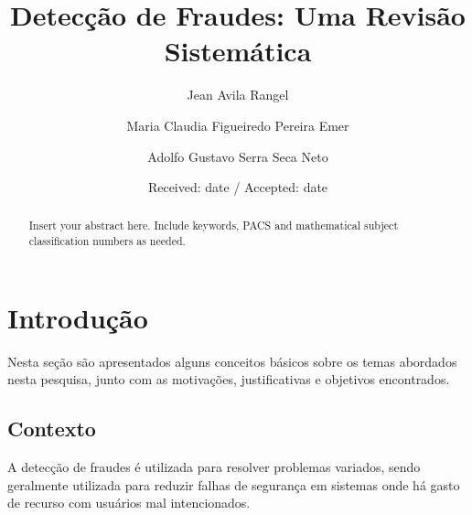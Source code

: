 \documentclass[smallextended]{svjour3}       %
\begin{document}
	
\title{Detecção de Fraudes: Uma Revisão Sistemática
}
\subtitle{}


\author{Jean Avila Rangel         \and
	Maria Claudia Figueiredo Pereira Emer \and
	Adolfo Gustavo Serra Seca Neto
}

	\date{Received: date / Accepted: date}
	\maketitle
	
	\begin{abstract}
		Insert your abstract here. Include keywords, PACS and mathematical
		subject classification numbers as needed.
	\end{abstract}
	
\section{Introdução}

Nesta seção são apresentados alguns conceitos básicos sobre os temas abordados nesta pesquisa, junto com as motivações, justificativas e objetivos encontrados.

\subsection{Contexto}

A detecção de fraudes é utilizada para resolver problemas variados, sendo geralmente utilizada para reduzir falhas de segurança em sistemas onde há gasto de recurso com usuários mal intencionados.
\end{document}
